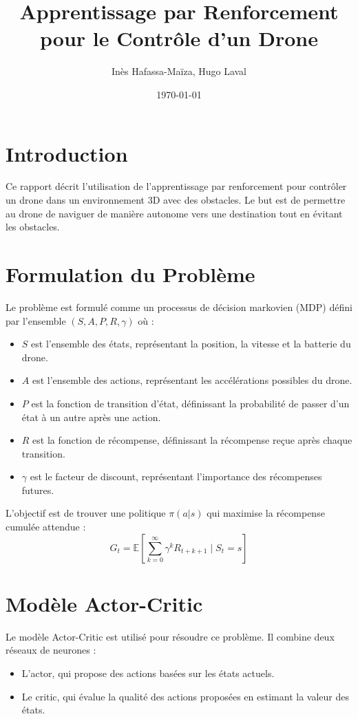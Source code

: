 \documentclass[a4paper, 12pt]{article}
\title{Apprentissage par Renforcement pour le Contrôle d'un Drone}
\author{Inès Hafassa-Maïza, Hugo Laval}
\date{\today}
\begin{document}
\maketitle

\section{Introduction}
Ce rapport décrit l'utilisation de l'apprentissage par renforcement pour contrôler un drone dans un environnement 3D avec des obstacles. Le but est de permettre au drone de naviguer de manière autonome vers une destination tout en évitant les obstacles.

\section{Formulation du Problème}
Le problème est formulé comme un processus de décision markovien (MDP) défini par l'ensemble $(S, A, P, R, \gamma)$ où :
\begin{itemize}
    \item $S$ est l'ensemble des états, représentant la position, la vitesse et la batterie du drone.
    \item $A$ est l'ensemble des actions, représentant les accélérations possibles du drone.
    \item $P$ est la fonction de transition d'état, définissant la probabilité de passer d'un état à un autre après une action.
    \item $R$ est la fonction de récompense, définissant la récompense reçue après chaque transition.
    \item $\gamma$ est le facteur de discount, représentant l'importance des récompenses futures.
\end{itemize}

L'objectif est de trouver une politique $\pi(a|s)$ qui maximise la récompense cumulée attendue :
\[
G_t = \mathbb{E} \left[ \sum_{k=0}^{\infty} \gamma^k R_{t+k+1} \mid S_t = s \right]
\]

\section{Modèle Actor-Critic}
Le modèle Actor-Critic est utilisé pour résoudre ce problème. Il combine deux réseaux de neurones :
\begin{itemize}
    \item L'actor, qui propose des actions basées sur les états actuels.
    \item Le critic, qui évalue la qualité des actions proposées en estimant la valeur des états.
\end{itemize}
\end{document}
